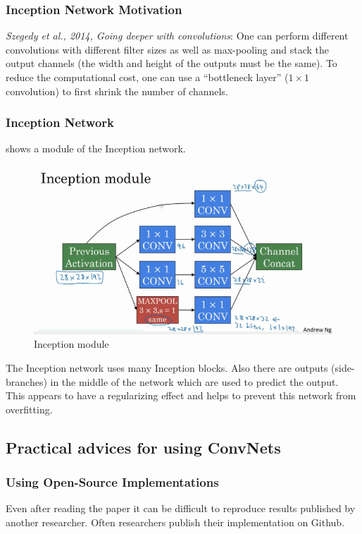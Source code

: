 \documentclass{article}
\begin{document}
\subsubsection{Inception Network Motivation}
\emph{Szegedy et al., 2014, Going deeper with convolutions}:
One can perform different convolutions with different filter sizes as well as max-pooling and stack the output channels
(the width and height of the outputs must be the same).
To reduce the computational cost, one can use a ``bottleneck layer'' ($1\times 1$ convolution) to first shrink the number of channels.

\subsubsection{Inception Network}
 shows a module of the Inception network.
\begin{figure}[htbp]
  \begin{center}
    \includegraphics[width=\textwidth]{inception}
    \caption{Inception module}
    \label{fig:inception}
  \end{center}
\end{figure}
The Inception network uses many Inception blocks.
Also there are outputs (side-branches) in the middle of the network which are used to predict the output.
This appears to have a regularizing effect and helps to prevent this network from overfitting.

\subsection{Practical advices for using ConvNets}
\subsubsection{Using Open-Source Implementations}
Even after reading the paper it can be difficult to reproduce results published by another researcher.
Often researchers publish their implementation on Github.
\end{document}
